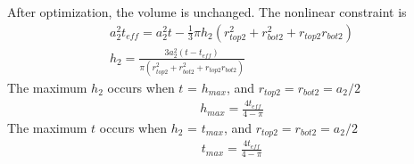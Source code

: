 \documentclass[12pt]{article}
\numberwithin{equation}{section}
\numberwithin{equation}{section}
\begin{document}
After optimization, the volume is unchanged.  The nonlinear constraint is
\begin{align}
 a_{2}^2t_{eff} =a_{2}^2t - \frac{1}{3}\pi h_2(r_{top2}^2+r_{bot2}^2+r_{top2}r_{bot2})\nonumber \\
 h_2 = \frac{3a_{2}^2(t - t_{eff} )}{\pi(r_{top2}^2+r_{bot2}^2+r_{top2}r_{bot2})} 
 \end{align}
The maximum $h_2$ occurs when  $t$ = $h_{max}$, and $r_{top2} = r_{bot2} = a_2/2$
\begin{align*}
h_{max} = \frac {4t_{eff}}{4-\pi}
\end{align*}
The maximum $t$ occurs when $h_2$ = $t_{max}$, and $r_{top2} = r_{bot2} = a_2/2$
\begin{align*}
t_{max} =\frac {4t_{eff}}{4-\pi}\\
\end{align*}
 
\end{document}
